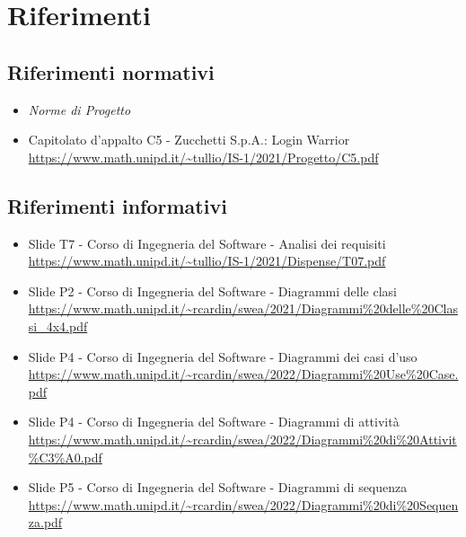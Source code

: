 \section{Riferimenti}
\subsection{Riferimenti normativi}
\begin{itemize}
  \item \textit{Norme di Progetto}
  \item Capitolato d'appalto C5 - Zucchetti S.p.A.: Login Warrior \\
  \url{https://www.math.unipd.it/~tullio/IS-1/2021/Progetto/C5.pdf}
\end{itemize}

\subsection{Riferimenti informativi}
\begin{itemize}
  \item Slide T7 - Corso di Ingegneria del Software - Analisi dei requisiti \\
  \url{https://www.math.unipd.it/~tullio/IS-1/2021/Dispense/T07.pdf}
  \item Slide P2 - Corso di Ingegneria del Software - Diagrammi delle clasi \\
  \url{https://www.math.unipd.it/~rcardin/swea/2021/Diagrammi%20delle%20Classi_4x4.pdf}
  \item Slide P4 - Corso di Ingegneria del Software - Diagrammi dei casi d'uso \\
  \url{https://www.math.unipd.it/~rcardin/swea/2022/Diagrammi%20Use%20Case.pdf}
  \item Slide P4 - Corso di Ingegneria del Software - Diagrammi di attività \\
  \url{https://www.math.unipd.it/~rcardin/swea/2022/Diagrammi%20di%20Attivit\%C3\%A0.pdf}  %
  \item Slide P5 - Corso di Ingegneria del Software - Diagrammi di sequenza \\
  \url{https://www.math.unipd.it/~rcardin/swea/2022/Diagrammi%20di%20Sequenza.pdf}
\end{itemize}
